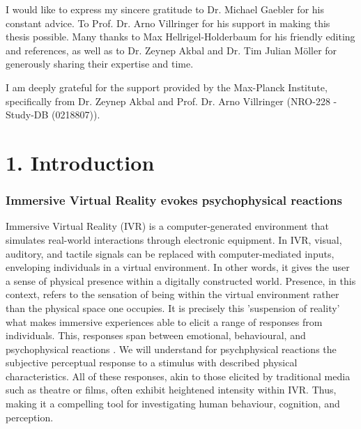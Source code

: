 \documentclass[12pt,oneside,openright]{report}
\begin{document}
\begin{adjustwidth}{1cm}{1cm}

I would like to express my sincere gratitude to Dr. Michael Gaebler for his constant advice.  To Prof. Dr. Arno Villringer for his support in making this thesis possible. Many thanks to Max Hellrigel-Holderbaum for his friendly editing and references, as well as to Dr. Zeynep Akbal and Dr. Tim Julian Möller for generously sharing their expertise and time.

I am deeply grateful for the support provided by the Max-Planck Institute, specifically from Dr. Zeynep Akbal and Prof. Dr. Arno Villringer (NRO-228 - Study-DB (0218807)).
    
\end{adjustwidth}

\clearpage

\section*{1. Introduction}
\subsubsection*{Immersive Virtual Reality evokes psychophysical reactions}

Immersive Virtual Reality (IVR) is a computer-generated environment that simulates real-world interactions through electronic equipment. In IVR, visual, auditory, and tactile signals can be replaced with computer-mediated inputs, enveloping individuals in a virtual environment. In other words, it gives the user a sense of physical presence within a digitally constructed world. Presence, in this context, refers to the sensation of being within the virtual environment rather than the physical space one occupies. It is precisely this 'suspension of reality' what makes immersive experiences able to elicit a range of responses from individuals. This, responses span between emotional, behavioural, and psychophysical reactions \parencite{SanchezVives2005FromPT}. We will understand for psychphysical reactions the subjective perceptual response to a stimulus with described physical characteristics. All of these responses, akin to those elicited by traditional media such as theatre or films, often exhibit heightened intensity within IVR. Thus, making it a compelling tool for investigating human behaviour, cognition, and perception. 
\end{document}
